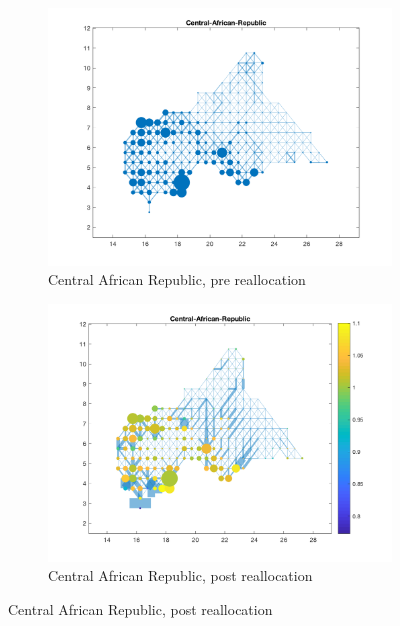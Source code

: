 \documentclass[11pt, oneside]{article}   	%
\begin{document}

\begin{figure}[!p]
\centering
\caption{Reallocation scenario for different countries}

\begin{subfigure}[c]{0.45\textwidth}
\includegraphics[width=\textwidth, trim={2cm 1cm 1.5cm 0cm},clip]{../../Build/output/Matlab_graphs/Nicer_graphs/Central-African-Republic_stat.png}
\caption{Central African Republic, pre reallocation}
\label{fig:cae_pre}
\end{subfigure}
\begin{subfigure}[c]{0.45\textwidth}
\includegraphics[width=\textwidth, trim={2cm 1cm 1.5cm 0cm},clip]{../../Build/output/Matlab_graphs/Nicer_graphs/Central-African-Republic_opt.png}
\caption{Central African Republic, post reallocation}
\label{fig:cae_post}
\end{subfigure}


\end{figure}
\end{document}
